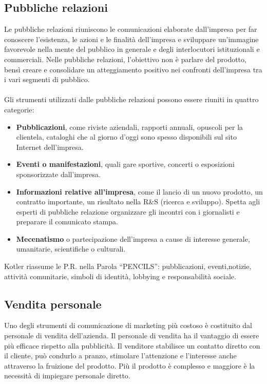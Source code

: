 \subsection{Pubbliche relazioni}
Le pubbliche relazioni riuniscono le comunicazioni
elaborate dall'impresa per far conoscere l’esistenza, le azioni e le finalità dell'impresa e sviluppare
un’immagine favorevole nella mente del pubblico in
generale e degli interlocutori istituzionali e commerciali. Nelle pubbliche relazioni, l’obiettivo non è parlare del prodotto, bensì creare e consolidare un atteggiamento positivo nei confronti dell'impresa tra i vari segmenti di pubblico.
\\
\\
Gli strumenti utilizzati dalle pubbliche relazioni possono essere riuniti in quattro categorie:
\begin{itemize}
	\item \textbf{Pubblicazioni}, come riviste aziendali, rapporti annuali, opuscoli per la clientela, cataloghi che al giorno d’oggi sono spesso disponibili sul sito Internet dell'impresa.
	\item \textbf{Eventi o manifestazioni}, quali gare sportive, concerti o	esposizioni sponsorizzate dall’impresa.
	\item \textbf{Informazioni relative all’impresa}, come il lancio di un nuovo prodotto, un contratto importante, un risultato nella R\&S (ricerca e sviluppo). Spetta agli
	esperti di pubbliche relazione organizzare gli incontri con i giornalisti e preparare il comunicato stampa.
	\item \textbf{Mecenatismo} o partecipazione dell'impresa a cause di interesse generale, umanitarie, scientifiche o culturali.
\end{itemize}
Kotler riassume le P.R. nella Parola “PENCILS”: pubblicazioni, eventi,notizie, attività comunitarie, simboli di identità, lobbying e responsabilità sociale.

\subsection{Vendita personale}
Uno degli strumenti di comunicazione di marketing più costoso è costituito dal personale di vendita dell'azienda.
Il personale di vendita ha il vantaggio di essere più efficace rispetto alla pubblicità. Il venditore stabilisce un contatto diretto con il cliente, può condurlo a pranzo, stimolare l’attenzione e l’interesse anche attraverso la fruizione del prodotto. Più il prodotto è complesso e maggiore è la necessità di impiegare personale diretto.

